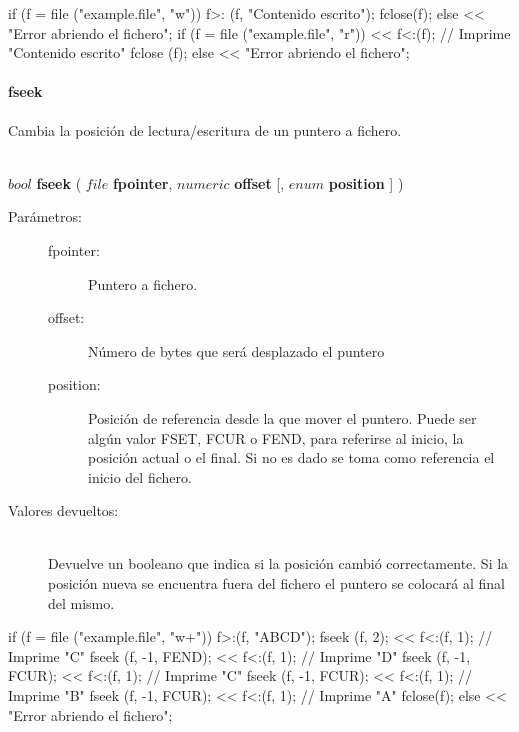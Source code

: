 \begin{myverbatim}  
   if (f = file ("example.file", "w")){
      f>: (f, "Contenido escrito"); 
      fclose(f);
   } else {
      << "Error abriendo el fichero";
   }
   if (f = file ("example.file", "r")){
      << f<:(f); // Imprime "Contenido escrito"
      fclose (f);
   } else {
      << "Error abriendo el fichero";
   }
\end{myverbatim}

\paragraph{fseek}
Cambia la posición de lectura/escritura de un puntero a fichero.

\begin{framed}
\hfill \\ $bool$ \textbf{fseek} ( $file$ \textbf{fpointer}, $numeric$ \textbf{offset} [, $enum$ \textbf{position} ]  )  
\begin{description}
\item [Parámetros:] \hfill 
   \begin{description}
   \item[fpointer:] Puntero a fichero. 
   \item[offset:] Número de bytes que será desplazado el puntero
   \item[position:] Posición de referencia desde la que mover el puntero. Puede ser algún valor 
   FSET, FCUR o FEND, para referirse al inicio, la posición actual o el final. Si no es dado se
   toma como referencia el inicio del fichero.
   \end{description}
\item[Valores devueltos:] \hfill \\
   Devuelve un booleano que indica si la posición cambió correctamente. Si la posición 
   nueva se encuentra fuera del fichero el puntero se colocará al final del mismo.
\end{description}
\end{framed}

\begin{myverbatim}  
   if (f = file ("example.file", "w+")){
      f>:(f, "ABCD");
      fseek (f, 2);
      << f<:(f, 1); // Imprime "C"
      fseek (f, -1, FEND);
      << f<:(f, 1); // Imprime "D"
      fseek (f, -1, FCUR);
      << f<:(f, 1); // Imprime "C"
      fseek (f, -1, FCUR);
      << f<:(f, 1); // Imprime "B"
      fseek (f, -1, FCUR);
      << f<:(f, 1); // Imprime "A"
      fclose(f);
   } else {
      << "Error abriendo el fichero";
   }
\end{myverbatim}

